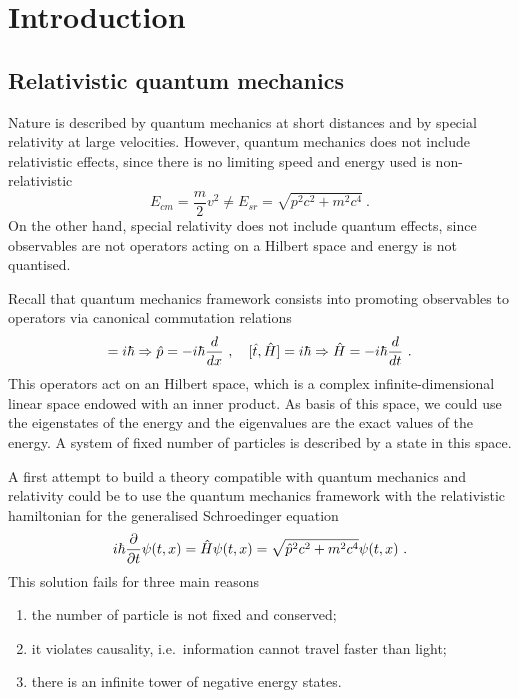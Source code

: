 \part{Introduction}

\chapter{Relativistic quantum mechanics}

    Nature is described by quantum mechanics at short distances and by special relativity at large velocities. However, quantum mechanics does not include relativistic effects, since there is no limiting speed and energy used is non-relativistic
    \begin{equation*}
        E_{cm} = \frac{m}{2} v^2 \neq E_{sr} = \sqrt{p^2 c^2 + m^2 c^4} ~.
    \end{equation*}
    On the other hand, special relativity does not include quantum effects, since observables are not operators acting on a Hilbert space and energy is not quantised. 
    
    Recall that quantum mechanics framework consists into promoting observables to operators via canonical commutation relations 
    \begin{equation*}
        [\hat x, \hat p] = i \hbar \Rightarrow \hat p = - i \hbar \dv{}{x} ~, \quad [\hat t, \hat H] = i \hbar \Rightarrow \hat H = - i \hbar \dv{}{t} ~.
    \end{equation*}
    This operators act on an Hilbert space, which is a complex infinite-dimensional linear space endowed with an inner product. As basis of this space, we could use the eigenstates of the energy and the eigenvalues are the exact values of the energy. A system of fixed number of particles is described by a state in this space.

    A first attempt to build a theory compatible with quantum mechanics and relativity could be to use the quantum mechanics framework with the relativistic hamiltonian for the generalised Schroedinger equation
    \begin{equation*}
        i \hbar \frac{\partial}{\partial t} \psi(t, x) = \hat H \psi(t, x) = \sqrt{\hat p^2 c^2 + m^2 c^4} \psi(t, x) ~.
    \end{equation*}
    This solution fails for three main reasons
    \begin{enumerate}
        \item the number of particle is not fixed and conserved;
        \item it violates causality, i.e.~information cannot travel faster than light;
        \item there is an infinite tower of negative energy states.
    \end{enumerate}

